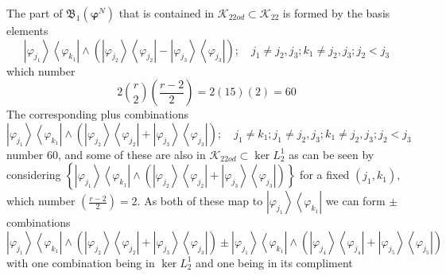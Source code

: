 \documentclass[aps,preprint]{revtex4}%
\begin{document}
The part of $\mathfrak{B}_{1}\left(  \mathbf{\varphi}^{N}\right)  $ that is
contained in $\mathcal{K}_{22od}\subset\mathcal{K}_{22}$ is formed by the
basis elements
\begin{equation}
\left\vert \varphi_{j_{1}}\right\rangle \left\langle \varphi_{k_{1}%
}\right\vert \wedge\left(  \left\vert \varphi_{j_{2}}\right\rangle
\left\langle \varphi_{j_{2}}\right\vert -\left\vert \varphi_{j_{3}%
}\right\rangle \left\langle \varphi_{j_{3}}\right\vert \right)  ;\quad
j_{1}\neq j_{2},j_{3};k_{1}\neq j_{2},j_{3};j_{2}<j_{3}%
\end{equation}
which number
\begin{equation}
2\binom{r}{2}\left(  \frac{r-2}{2}\right)  =2\left(  15\right)  \left(
2\right)  =60
\end{equation}
The corresponding plus combinations
\begin{equation}
\left\vert \varphi_{j_{1}}\right\rangle \left\langle \varphi_{k_{1}%
}\right\vert \wedge\left(  \left\vert \varphi_{j_{2}}\right\rangle
\left\langle \varphi_{j_{2}}\right\vert +\left\vert \varphi_{j_{3}%
}\right\rangle \left\langle \varphi_{j_{3}}\right\vert \right)  ;\quad
j_{1}\neq k_{1};j_{1}\neq j_{2},j_{3};k_{1}\neq j_{2},j_{3};j_{2}<j_{3}%
\end{equation}
number $60$, and some of these are also in $\mathcal{K}_{22od}\subset\ker
L_{2}^{1}$ as can be seen by considering $\left\{  \left\vert \varphi_{j_{1}%
}\right\rangle \left\langle \varphi_{k_{1}}\right\vert \wedge\left(
\left\vert \varphi_{j_{2}}\right\rangle \left\langle \varphi_{j_{2}%
}\right\vert +\left\vert \varphi_{j_{3}}\right\rangle \left\langle
\varphi_{j_{3}}\right\vert \right)  \right\}  $ for a fixed $\left(
j_{1},k_{1}\right)  ,$ which number $\left(  \frac{r-2}{2}\right)  =2.$ As
both of these map to $\left\vert \varphi_{j_{1}}\right\rangle \left\langle
\varphi_{k_{1}}\right\vert $ we can form $\pm$ combinations
\begin{equation}
\left\vert \varphi_{j_{1}}\right\rangle \left\langle \varphi_{k_{1}%
}\right\vert \wedge\left(  \left\vert \varphi_{j_{2}}\right\rangle
\left\langle \varphi_{j_{2}}\right\vert +\left\vert \varphi_{j_{3}%
}\right\rangle \left\langle \varphi_{j_{3}}\right\vert \right)  \pm\left\vert
\varphi_{j_{1}}\right\rangle \left\langle \varphi_{k_{1}}\right\vert
\wedge\left(  \left\vert \varphi_{j_{4}}\right\rangle \left\langle
\varphi_{j_{4}}\right\vert +\left\vert \varphi_{j_{5}}\right\rangle
\left\langle \varphi_{j_{5}}\right\vert \right)
\end{equation}
with one combination being in $\ker L_{2}^{1}$ and one being in its compliment
\end{document}

